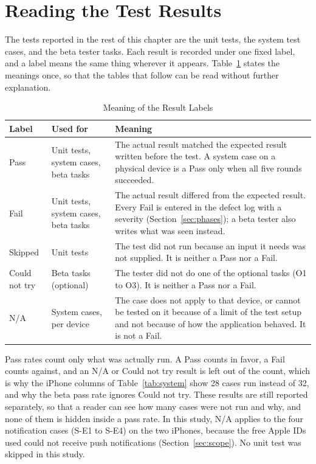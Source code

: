 \FloatBarrier
\section{Reading the Test Results}
\label{sec:readresults}
The tests reported in the rest of this chapter are the unit tests, the system test cases, and the beta tester tasks. Each result is recorded under one fixed label, and a label means the same thing wherever it appears. Table~\ref{tab:resultlabels} states the meanings once, so that the tables that follow can be read without further explanation.

\begin{table}[H]
    \centering
    \caption{Meaning of the Result Labels}
    \label{tab:resultlabels}
    \small
    \renewcommand{\arraystretch}{1.25}
    \begin{tabular}{|>{\raggedright\arraybackslash}p{}|>{\raggedright\arraybackslash}p{}|>{\raggedright\arraybackslash}p{}|}
        \hline
        \textbf{Label} & \textbf{Used for} & \textbf{Meaning} \\
        \hline
        Pass & Unit tests, system cases, beta tasks & The actual result matched the expected result written before the test. A system case on a physical device is a Pass only when all five rounds succeeded. \\
        \hline
        Fail & Unit tests, system cases, beta tasks & The actual result differed from the expected result. Every Fail is entered in the defect log with a severity (Section~\ref{sec:phases}); a beta tester also writes what was seen instead. \\
        \hline
        Skipped & Unit tests & The test did not run because an input it needs was not supplied. It is neither a Pass nor a Fail. \\
        \hline
        Could not try & Beta tasks (optional) & The tester did not do one of the optional tasks (O1 to O3). It is neither a Pass nor a Fail. \\
        \hline
        N/A & System cases, per device & The case does not apply to that device, or cannot be tested on it because of a limit of the test setup and not because of how the application behaved. It is not a Fail. \\
        \hline
    \end{tabular}
\end{table}

Pass rates count only what was actually run. A Pass counts in favor, a Fail counts against, and an N/A or Could not try result is left out of the count, which is why the iPhone columns of Table~\ref{tab:system} show 28 cases run instead of 32, and why the beta pass rate ignores Could not try. These results are still reported separately, so that a reader can see how many cases were not run and why, and none of them is hidden inside a pass rate. In this study, N/A applies to the four notification cases (S-E1 to S-E4) on the two iPhones, because the free Apple IDs used could not receive push notifications (Section~\ref{sec:scope}). No unit test was skipped in this study.

